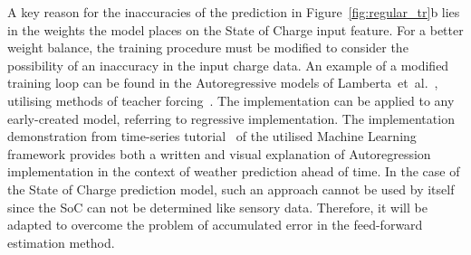 %
%
A key reason for the inaccuracies of the prediction in \mbox{Figure~\ref{fig:regular_tr}b} lies in the weights the model places on the State of Charge input feature.
For a better weight balance, the training procedure must be modified to consider the possibility of an inaccuracy in the input charge data.
An example of a modified training loop can be found in the Autoregressive models of \mbox{Lamberta et al.~\cite{time_2020}}, utilising methods of teacher forcing~\cite{brownlee_what_2017}.%
The implementation can be applied to any early-created model, referring to regressive implementation.
 {The implementation demonstration from time-series tutorial~\cite{time_2020} of the utilised Machine Learning framework provides both a written and visual explanation of Autoregression implementation in the context of weather prediction ahead of time.
In the case of the State of Charge prediction model, such an approach cannot be used by itself since the SoC can not be determined like sensory data.
Therefore, it will be adapted to overcome the problem of accumulated error in the feed-forward estimation method.}


